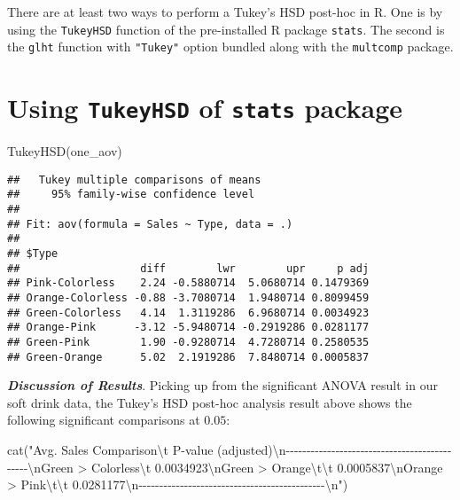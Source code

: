 \documentclass[
]{book}
\newenvironment{Shaded}{\begin{snugshade}}{\end{snugshade}}
\newcommand{\FunctionTok}[1]{\textcolor[rgb]{0.00,0.00,0.00}{#1}}
\newcommand{\NormalTok}[1]{#1}
\newcommand{\SpecialCharTok}[1]{\textcolor[rgb]{0.00,0.00,0.00}{#1}}
\newcommand{\StringTok}[1]{\textcolor[rgb]{0.31,0.60,0.02}{#1}}
\begin{document}
There are at least two ways to perform a Tukey's HSD post-hoc in R. One is by using the \texttt{TukeyHSD} function of the pre-installed R package \texttt{stats}. The second is the \texttt{glht} function with \texttt{"Tukey"} option bundled along with the \texttt{multcomp} package.

\hypertarget{using-tukeyhsd-of-stats-package}{%
\section{\texorpdfstring{Using \texttt{TukeyHSD} of \texttt{stats} package}{Using TukeyHSD of stats package}}\label{using-tukeyhsd-of-stats-package}}

\begin{Shaded}
\begin{Highlighting}[]
\FunctionTok{TukeyHSD}\NormalTok{(one\_aov)}
\end{Highlighting}
\end{Shaded}

\begin{verbatim}
##   Tukey multiple comparisons of means
##     95% family-wise confidence level
## 
## Fit: aov(formula = Sales ~ Type, data = .)
## 
## $Type
##                   diff        lwr        upr     p adj
## Pink-Colorless    2.24 -0.5880714  5.0680714 0.1479369
## Orange-Colorless -0.88 -3.7080714  1.9480714 0.8099459
## Green-Colorless   4.14  1.3119286  6.9680714 0.0034923
## Orange-Pink      -3.12 -5.9480714 -0.2919286 0.0281177
## Green-Pink        1.90 -0.9280714  4.7280714 0.2580535
## Green-Orange      5.02  2.1919286  7.8480714 0.0005837
\end{verbatim}

\textbf{\emph{Discussion of Results}}. Picking up from the significant ANOVA result in our soft drink data, the Tukey's HSD post-hoc analysis result above shows the following significant comparisons at \(0.05\):

\begin{Shaded}
\begin{Highlighting}[]
\FunctionTok{cat}\NormalTok{(}\StringTok{"Avg. Sales Comparison}\SpecialCharTok{\textbackslash{}t}\StringTok{ P{-}value (adjusted)}\SpecialCharTok{\textbackslash{}n}\StringTok{{-}{-}{-}{-}{-}{-}{-}{-}{-}{-}{-}{-}{-}{-}{-}{-}{-}{-}{-}{-}{-}{-}{-}{-}{-}{-}{-}{-}{-}{-}{-}{-}{-}{-}{-}{-}{-}{-}{-}{-}{-}{-}{-}{-}{-}}\SpecialCharTok{\textbackslash{}n}\StringTok{Green \textgreater{} Colorless}\SpecialCharTok{\textbackslash{}t}\StringTok{ 0.0034923}\SpecialCharTok{\textbackslash{}n}\StringTok{Green \textgreater{} Orange}\SpecialCharTok{\textbackslash{}t\textbackslash{}t}\StringTok{ 0.0005837}\SpecialCharTok{\textbackslash{}n}\StringTok{Orange \textgreater{} Pink}\SpecialCharTok{\textbackslash{}t\textbackslash{}t}\StringTok{ 0.0281177}\SpecialCharTok{\textbackslash{}n}\StringTok{{-}{-}{-}{-}{-}{-}{-}{-}{-}{-}{-}{-}{-}{-}{-}{-}{-}{-}{-}{-}{-}{-}{-}{-}{-}{-}{-}{-}{-}{-}{-}{-}{-}{-}{-}{-}{-}{-}{-}{-}{-}{-}{-}{-}{-}}\SpecialCharTok{\textbackslash{}n}\StringTok{"}\NormalTok{)}
\end{Highlighting}
\end{Shaded}
\end{document}
